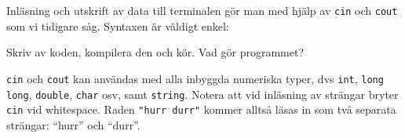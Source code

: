 Inläsning och utskrift av data till terminalen gör man med hjälp av \texttt{cin} och \texttt{cout} som vi tidigare såg. Syntaxen är väldigt enkel:



Skriv av koden, kompilera den och kör. Vad gör programmet?

\texttt{cin} och \texttt{cout} kan användas med alla inbyggda numeriska typer, dvs \texttt{int}, \texttt{long long}, \texttt{double}, \texttt{char} osv, samt \texttt{string}. Notera att vid inläsning av strängar bryter \texttt{cin} vid whitespace. Raden \texttt{"hurr durr"} kommer alltså läsas in som två separata strängar: ``hurr'' och ``durr''.
